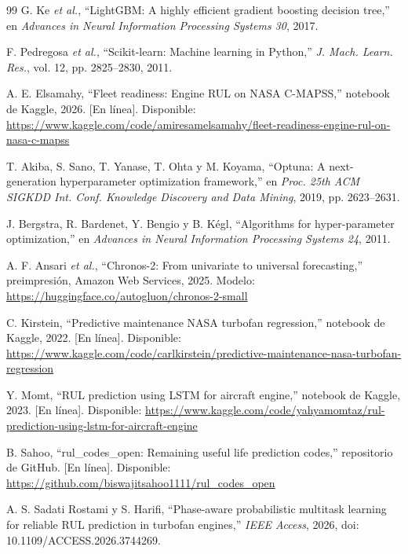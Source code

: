 \documentclass[conference]{IEEEtran}
\begin{document}
\begin{thebibliography}{99}
 G. Ke \emph{et al.}, ``LightGBM: A highly efficient gradient boosting decision tree,'' en \emph{Advances in Neural Information Processing Systems 30}, 2017.

 F. Pedregosa \emph{et al.}, ``Scikit-learn: Machine learning in Python,'' \emph{J. Mach. Learn. Res.}, vol. 12, pp. 2825--2830, 2011.

 A. E. Elsamahy, ``Fleet readiness: Engine RUL on NASA C-MAPSS,'' notebook de Kaggle, 2026. [En línea]. Disponible: \url{https://www.kaggle.com/code/amiresamelsamahy/fleet-readiness-engine-rul-on-nasa-c-mapss}

 T. Akiba, S. Sano, T. Yanase, T. Ohta y M. Koyama, ``Optuna: A next-generation hyperparameter optimization framework,'' en \emph{Proc. 25th ACM SIGKDD Int. Conf. Knowledge Discovery and Data Mining}, 2019, pp. 2623--2631.

 J. Bergstra, R. Bardenet, Y. Bengio y B. Kégl, ``Algorithms for hyper-parameter optimization,'' en \emph{Advances in Neural Information Processing Systems 24}, 2011.

 A. F. Ansari \emph{et al.}, ``Chronos-2: From univariate to universal forecasting,'' preimpresión, Amazon Web Services, 2025. Modelo: \url{https://huggingface.co/autogluon/chronos-2-small}

 C. Kirstein, ``Predictive maintenance NASA turbofan regression,'' notebook de Kaggle, 2022. [En línea]. Disponible: \url{https://www.kaggle.com/code/carlkirstein/predictive-maintenance-nasa-turbofan-regression}

 Y. Momt, ``RUL prediction using LSTM for aircraft engine,'' notebook de Kaggle, 2023. [En línea]. Disponible: \url{https://www.kaggle.com/code/yahyamomtaz/rul-prediction-using-lstm-for-aircraft-engine}

 B. Sahoo, ``rul\_codes\_open: Remaining useful life prediction codes,'' repositorio de GitHub. [En línea]. Disponible: \url{https://github.com/biswajitsahoo1111/rul_codes_open}

 A. S. Sadati Rostami y S. Harifi, ``Phase-aware probabilistic multitask learning for reliable RUL prediction in turbofan engines,'' \emph{IEEE Access}, 2026, doi: 10.1109/ACCESS.2026.3744269.

\end{thebibliography}
\end{document}
